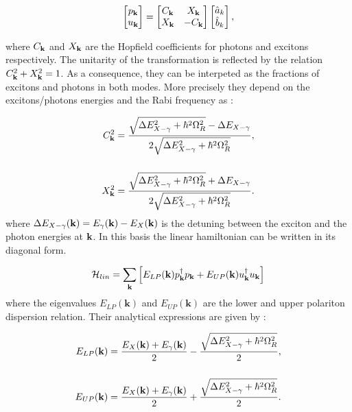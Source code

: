 \begin{equation}
    \label{eq:unitary_transformation}
    \begin{bmatrix}
    p_{\mathbf{k}} \\
    u_{\mathbf{k}}
    \end{bmatrix} 
    = 
    \begin{bmatrix}
    C_{\mathbf{k}} & X_{\mathbf{k}} \\
    X_{\mathbf{k}} & -C_{\mathbf{k}}
    \end{bmatrix}
    \begin{bmatrix}
    \hat{a}_k \\
    \hat{b}_k
    \end{bmatrix},
\end{equation}

where $C_{\mathbf{k}}$ and $X_{\mathbf{k}}$ are the Hopfield coefficients for photons and excitons respectively. The unitarity of the transformation
is reflected by the relation $C_{\mathbf{k}}^2 + X_{\mathbf{k}}^2 = 1$. As a consequence, they can be interpeted as the fractions of excitons and photons in both modes.
More precisely they depend on the excitons/photons energies and the Rabi frequency as : 

\begin{subequations}
    \begin{align}
    C_{\mathbf{k}}^2 &= \dfrac{\sqrt{\Delta E_{X-\gamma}^2 + \hbar^2\Omega_R^2}- \Delta E_{X-\gamma}}{2\sqrt{\Delta E_{X-\gamma}^2 + \hbar^2\Omega_R^2}}, \\[5mm]
    X_{\mathbf{k}}^2 &=  \dfrac{\sqrt{\Delta E_{X-\gamma}^2 + \hbar^2\Omega_R^2}+ \Delta E_{X-\gamma}}{2\sqrt{\Delta E_{X-\gamma}^2 + \hbar^2\Omega_R^2}}.
    \end{align}
    \label{eq:hopfield_coefficients}
\end{subequations}
where $\Delta E_{X-\gamma}(\mathbf{k}) = E_{\gamma}(\mathbf{k})-E_X(\mathbf{k})$ is the detuning between the exciton and the photon energies at $\mathbf{k}$. 
In this basis the linear hamiltonian can be written in its diagonal form.



\begin{equation}
    \mathcal{H}_{lin} = \sum_{\mathbf{k}}\left[E_{LP}(\mathbf{k})p_{\mathbf{k}}^{\dagger}p_{\mathbf{k}} + E_{UP}(\mathbf{k})u_{\mathbf{k}}^{\dagger}u_{\mathbf{k}}\right]
    \label{eq:linear_hamiltonian_diagonal}
\end{equation}
where the eigenvalues $E_{LP}(\mathbf{k})$ and $E_{UP}(\mathbf{k})$ are the lower and upper polariton dispersion relation. Their analytical expressions 
are given by :

\begin{equation}
    \begin{align}
    E_{LP}(\mathbf{k}) &= \dfrac{E_X(\mathbf{k})+E_{\gamma}(\mathbf{k})}{2} - \dfrac{\sqrt{\Delta E_{X-\gamma}^2 + \hbar^2\Omega_R^2}}{2}, \\[5mm]
    E_{UP}(\mathbf{k}) &= \dfrac{E_X(\mathbf{k})+E_{\gamma}(\mathbf{k})}{2} + \dfrac{\sqrt{\Delta E_{X-\gamma}^2 + \hbar^2\Omega_R^2}}{2}.
    \end{align}
    \label{eq:polariton_dispersion}
\end{equation}

